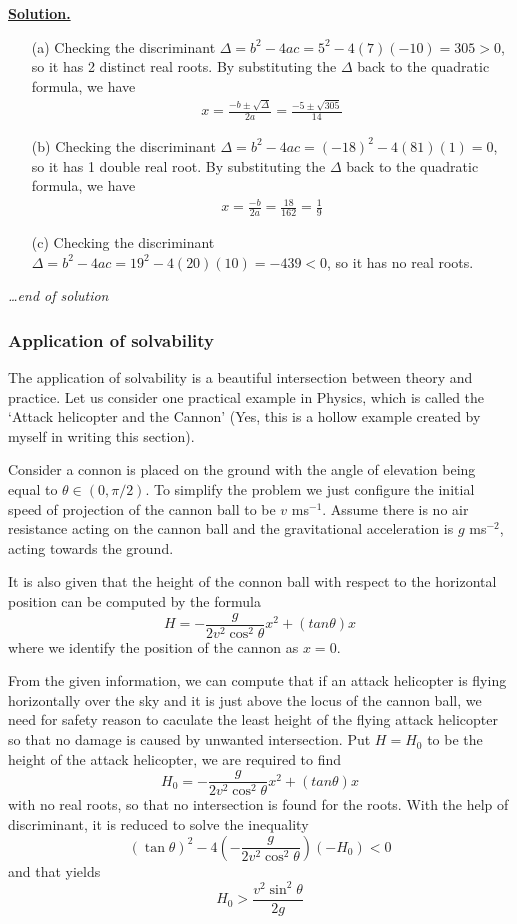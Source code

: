 \documentclass[12pt]{article}
\newenvironment{solution}{\begin{snugshade*} \underline{\textbf{Solution.}} \par}{\hfill \textit{\dots end of solution} \end{snugshade*}}
\begin{document}
    \begin{solution}
        \begin{enumerate}
            \item[(a)] Checking the discriminant $\Delta=b^2-4ac=5^2-4(7)(-10)=305>0$, so it has 2 distinct real roots. By substituting the $\Delta$ back to the quadratic formula, we have \begin{align*}
                x=\frac{-b\pm\sqrt{\Delta}}{2a}=\frac{-5\pm\sqrt{305}}{14}
            \end{align*}
            \item[(b)] Checking the discriminant $\Delta=b^2-4ac=(-18)^2-4(81)(1)=0$, so it has 1 double real root. By substituting the $\Delta$ back to the quadratic formula, we have \begin{align*}
                x=\frac{-b}{2a}=\frac{18}{162}=\frac{1}{9}
            \end{align*}
            \item[(c)] Checking the discriminant $\Delta=b^2-4ac=19^2-4(20)(10)=-439<0$, so it has no real roots. 
        \end{enumerate}
    \end{solution}

    \subsubsection*{Application of solvability}

    The application of solvability is a beautiful intersection between theory and practice. Let us consider one practical example in Physics, which is called the `Attack helicopter and the Cannon' (Yes, this is a hollow example created by myself in writing this section).

    Consider a connon is placed on the ground with the angle of elevation being equal to $\theta\in(0,\pi/2)$. To simplify the problem we just configure the initial speed of projection of the cannon ball to be $v$ ms$^{-1}$. Assume there is no air resistance acting on the cannon ball and the gravitational acceleration is $g$ ms$^{-2}$, acting towards the ground.

    It is also given that the height of the connon ball with respect to the horizontal position can be computed by the formula \[H=-\frac{g}{2v^2\cos^2{\theta}}x^2+(tan{\theta})x\] where we identify the position of the cannon as $x=0$.

    From the given information, we can compute that if an attack helicopter is flying horizontally over the sky and it is just above the locus of the cannon ball, we need for safety reason to caculate the least height of the flying attack helicopter so that no damage is caused by unwanted intersection. Put $H=H_0$ to be the height of the attack helicopter, we are required to find \[H_0=-\frac{g}{2v^2\cos^2{\theta}}x^2+(tan{\theta})x\] with no real roots, so that no intersection is found for the roots. With the help of discriminant, it is reduced to solve the inequality \[(\tan{\theta})^2-4(-\frac{g}{2v^2\cos^2{\theta}})(-H_0)<0\] and that yields \[H_0>\frac{v^2\sin^2{\theta}}{2g}\]
\end{document}

